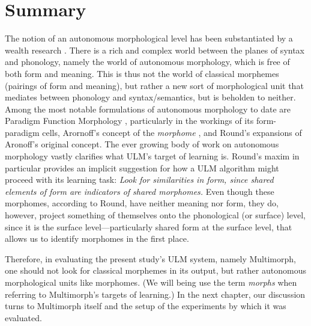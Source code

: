 \section{Summary}\label{sum}
The notion of an autonomous morphological level
has been substantiated by a wealth research \citep[including, e.g.,][]{stump:2001, aronoff:1994, round:2011, round:2015}.
There is a rich and complex 
world between the planes of syntax and phonology, namely the world of autonomous morphology, which is free of both form and meaning. This is thus not the world of classical morphemes (pairings of form and meaning), but rather a new sort of morphological unit that mediates between phonology and
syntax/semantics, but is beholden to neither.  
Among the most notable formulations of autonomous morphology to date are Paradigm Function Morphology \citep{stump:2001}, particularly in the workings of its form-paradigm cells, Arornoff's
concept of the \emph{morphome} \citep{aronoff:1994}, and Round's expansions \citep[e.g.,][]{round:2011,round:2015} of Aronoff's original concept. The ever growing body of work on autonomous morphology vastly clarifies what ULM's target of learning is. Round's maxim in particular provides an implicit suggestion for how a ULM algorithm might proceed with its learning task: \textit{Look for similarities in form, since shared elements of form are indicators of shared morphomes.} Even though these morphomes, according to Round, have neither meaning nor form, they do, however, project something of themselves onto the phonological (or surface) level, since it is the surface level---particularly shared  form at the surface level, that allows us to identify morphomes in the first place. 

Therefore, in evaluating the present study's ULM system, namely Multimorph, one should not look for classical morphemes in its output, but rather autonomous morphological units like morphomes. (We will being use the term \emph{morphs} when referring to Multimorph's targets of learning.)
In the next chapter, our discussion turns to Multimorph itself and the setup of the experiments by which it was evaluated.
